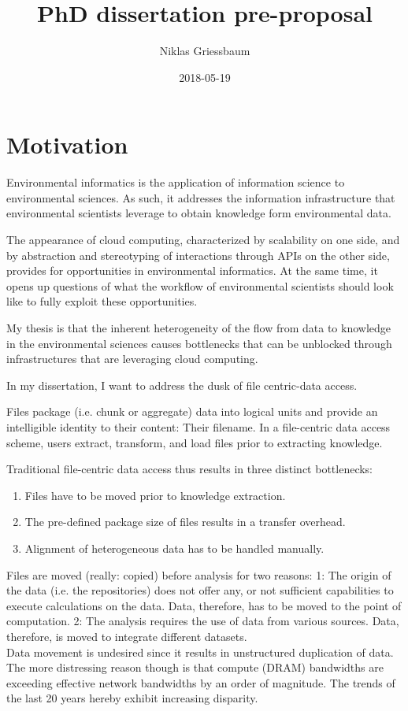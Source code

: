 \documentclass[a4paper,10pt]{article}
\title{PhD dissertation pre-proposal}
\author{Niklas Griessbaum}
\date{2018-05-19}
\begin{document}
\maketitle


\section{Motivation}

Environmental informatics is the application of information science to environmental sciences.
As such, it addresses the information infrastructure that environmental scientists leverage
to obtain knowledge form environmental data.

The appearance of cloud computing, characterized by scalability on one side, 
and by abstraction and stereotyping of interactions through \glspl{API} on the other side, 
provides for opportunities in environmental informatics. 
At the same time, it opens up questions of what the workflow
of environmental scientists should look like to fully exploit these opportunities.

My thesis is that the inherent heterogeneity of the flow from data to knowledge
in the environmental sciences causes bottlenecks that can be unblocked through 
infrastructures that are leveraging cloud computing.

In my dissertation, I want to address the dusk of file centric-data access.

Files package (i.e. chunk or aggregate) data into logical units and provide an intelligible identity to their content: Their filename.
In a file-centric data access scheme, users extract, transform, and load 
files prior to extracting knowledge.

Traditional file-centric data access thus results in three distinct bottlenecks:
\begin{enumerate}
 \item Files have to be moved prior to knowledge extraction.
 \item The pre-defined package size of files results in a transfer overhead.
 \item Alignment of heterogeneous data has to be handled manually.
\end{enumerate}

Files are moved (really: copied) before analysis for two reasons: 
1: The origin of the data (i.e. the repositories) does not offer any, or not sufficient capabilities to execute calculations on the data. Data, therefore,
has to be moved to the point of computation. 
2: The analysis requires the use of data from various sources. Data, therefore, is moved to integrate different datasets. \\
Data movement is undesired since it results in unstructured duplication of data.
The more distressing reason though is that compute (DRAM) bandwidths are exceeding effective network bandwidths by an order of magnitude. The trends of the last 20 years hereby exhibit increasing disparity.
\end{document}
